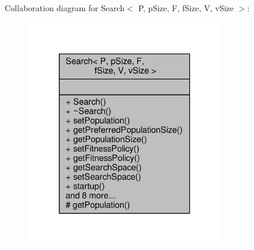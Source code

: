 Collaboration diagram for Search$<$ P, p\+Size, F, f\+Size, V, v\+Size $>$\+:\nopagebreak
\begin{figure}[H]
\begin{center}
\leavevmode
\includegraphics[width=247pt]{classSearch__coll__graph}
\end{center}
\end{figure}
